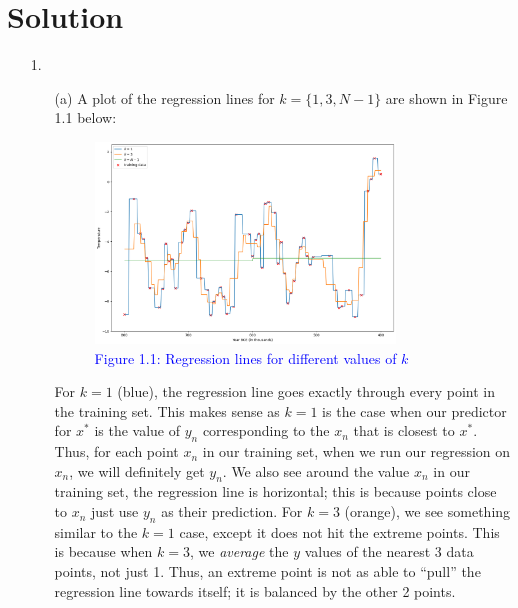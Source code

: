 \documentclass[submit]{../harvardml}
\newenvironment{solution}
  {\color{blue}\section*{Solution}}
{}
\begin{document}
\newpage
\begin{solution}

\begin{enumerate}
    \item [1.]
    \begin{enumerate}
        \item [(a)] A plot of the regression lines for $k= \{1,3,N-1\}$ are shown in Figure 1.1 below:
        \begin{figure}[H]
            \centering
            \includegraphics[width=0.8\textwidth]{img_output/p1.1a.png}
            \caption*{\textcolor{blue}{Figure 1.1: Regression lines for different values of $k$}}
            \label{fig:q1.1}
        \end{figure}
        For $k=1$ (blue), the regression line goes exactly through every point in the training set. This makes sense as $k=1$ is the case when our predictor for $x^*$ is the value of $y_n$ corresponding to the $x_n$ that is closest to $x^*$. Thus, for each point $x_n$ in our training set, when we run our regression on $x_n$, we will definitely get $y_n$. We also see around the value $x_n$ in our training set, the regression line is horizontal; this is because points close to $x_n$ just use $y_n$ as their prediction.
        \newline \newline
        For $k=3$ (orange), we see something similar to the $k=1$ case, except it does not hit the extreme points. This is because when $k=3$, we \textit{average} the $y$ values of the nearest 3 data points, not just 1. Thus, an extreme point is not as able to ``pull'' the regression line towards itself; it is balanced by the other 2 points.
        \newline \newline

\end{enumerate}
\end{enumerate}
\end{solution}
\end{document}
